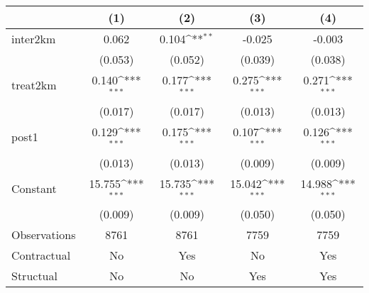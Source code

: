 {
\def\sym#1{\ifmmode^{#1}\else\(^{#1}\)\fi}
\begin{tabular}{l*{4}{c}}
\toprule
                &\multicolumn{1}{c}{(1)}         &\multicolumn{1}{c}{(2)}         &\multicolumn{1}{c}{(3)}         &\multicolumn{1}{c}{(4)}         \\
\midrule
inter2km        &    0.062         &    0.104\sym{**} &   -0.025         &   -0.003         \\
                &  (0.053)         &  (0.052)         &  (0.039)         &  (0.038)         \\
\addlinespace
treat2km        &    0.140\sym{***}&    0.177\sym{***}&    0.275\sym{***}&    0.271\sym{***}\\
                &  (0.017)         &  (0.017)         &  (0.013)         &  (0.013)         \\
\addlinespace
post1           &    0.129\sym{***}&    0.175\sym{***}&    0.107\sym{***}&    0.126\sym{***}\\
                &  (0.013)         &  (0.013)         &  (0.009)         &  (0.009)         \\
\addlinespace
Constant        &   15.755\sym{***}&   15.735\sym{***}&   15.042\sym{***}&   14.988\sym{***}\\
                &  (0.009)         &  (0.009)         &  (0.050)         &  (0.050)         \\
\midrule
Observations    &     8761         &     8761         &     7759         &     7759         \\
Contractual     &       No         &      Yes         &       No         &      Yes         \\
Structual       &       No         &       No         &      Yes         &      Yes         \\
\bottomrule
\end{tabular}
}
